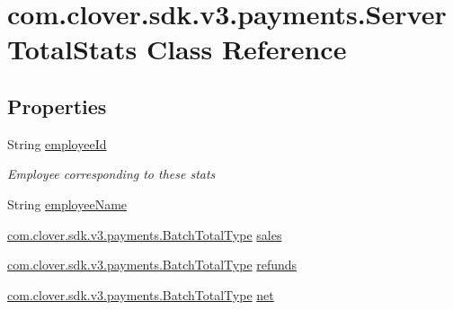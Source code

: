 \hypertarget{classcom_1_1clover_1_1sdk_1_1v3_1_1payments_1_1_server_total_stats}{}\section{com.\+clover.\+sdk.\+v3.\+payments.\+Server\+Total\+Stats Class Reference}
\label{classcom_1_1clover_1_1sdk_1_1v3_1_1payments_1_1_server_total_stats}
\subsection*{Properties}
\begin{DoxyCompactItemize}
\item 
String \hyperlink{classcom_1_1clover_1_1sdk_1_1v3_1_1payments_1_1_server_total_stats_a9f0cf0d1a1508785839473b3d10892d5}{employee\+Id}
\begin{DoxyCompactList}\small\item\em Employee corresponding to these stats \end{DoxyCompactList}\item 
String \hyperlink{classcom_1_1clover_1_1sdk_1_1v3_1_1payments_1_1_server_total_stats_aa0d23406586cebb1b2a8f8c2357f1a21}{employee\+Name}
\item 
\hyperlink{classcom_1_1clover_1_1sdk_1_1v3_1_1payments_1_1_batch_total_type}{com.\+clover.\+sdk.\+v3.\+payments.\+Batch\+Total\+Type} \hyperlink{classcom_1_1clover_1_1sdk_1_1v3_1_1payments_1_1_server_total_stats_a8122a7c345b18a981dcd470164f0cec9}{sales}
\item 
\hyperlink{classcom_1_1clover_1_1sdk_1_1v3_1_1payments_1_1_batch_total_type}{com.\+clover.\+sdk.\+v3.\+payments.\+Batch\+Total\+Type} \hyperlink{classcom_1_1clover_1_1sdk_1_1v3_1_1payments_1_1_server_total_stats_a0e86269a817d7628f095d1ec2acd460c}{refunds}
\item 
\hyperlink{classcom_1_1clover_1_1sdk_1_1v3_1_1payments_1_1_batch_total_type}{com.\+clover.\+sdk.\+v3.\+payments.\+Batch\+Total\+Type} \hyperlink{classcom_1_1clover_1_1sdk_1_1v3_1_1payments_1_1_server_total_stats_aa2f09fcd01c6debf667743ae4972adee}{net}

\end{DoxyCompactItemize}
